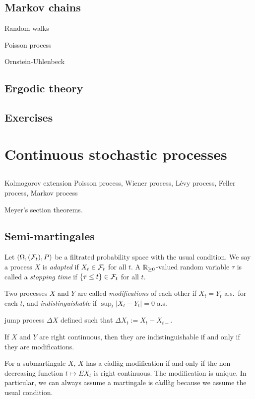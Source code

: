 \documentclass{../../large}
\newcommand{\cadlag}{c\`adl\`ag }
\begin{document}
\section{Markov chains}


Random walks

Poisson process

Ornstein-Uhlenbeck

\section{Ergodic theory}



\section*{Exercises}



\chapter{Continuous stochastic processes}

\section{}
Kolmogorov extension
Poisson process, Wiener process, L\'evy process, Feller process, Markov process

Meyer's section theorems.


\section{Semi-martingales}

\begin{prb}
Let $(\Omega,(\mathcal{F}_t),P)$ be a filtrated probability space with the usual condition.
We say a process $X$ is \emph{adapted} if $X_t\in\mathcal{F}_t$ for all $t$.
A $\mathbb{R}_{\ge0}$-valued random variable $\tau$ is called a \emph{stopping time} if $\{\tau\le t\}\in\mathcal{F}_t$ for all $t$.
\end{prb}


\begin{prb}
Two processes $X$ and $Y$ are called \emph{modifications} of each other if $X_t=Y_t$ a.s.~for each $t$, and \emph{indistinguishable} if $\sup_t|X_t-Y_t|=0$ a.s.

jump process $\Delta X$ defined such that $\Delta X_t:=X_t-X_{t-}$.
\begin{parts}
\item If $X$ and $Y$ are right continuous, then they are indistinguishable if and only if they are modifications.
\item For a submartingale $X$, $X$ has a \cadlag modification if and only if the non-decreasing function $t\mapsto EX_t$ is right continuous. The modification is unique. In particular, we can always assume a martingale is \cadlag because we assume the usual condition.
\end{parts}
\end{prb}
\end{document}
